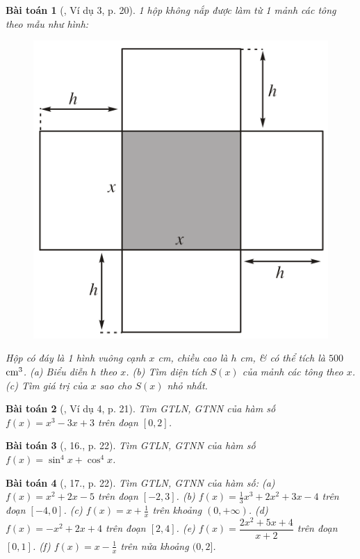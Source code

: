 \documentclass{article}
\newtheorem{baitoan}{Bài toán}
\begin{document}
\begin{baitoan}[\cite{SGK_Toan_12_giai_tich_nang_cao}, Ví dụ 3, p. 20]
	1 hộp không nắp được làm từ 1 mảnh các tông theo mẫu như hình:
	\begin{figure}[H]
		\centering
		\includegraphics[scale=.25]{hop_khong_nap}
	\end{figure}
	\noindent Hộp có đáy là 1 hình vuông cạnh $x$ {\rm cm}, chiều cao là $h$ {\rm cm}, \& có thể tích là $500$ $\rm cm^3$. (a) Biểu diễn $h$ theo $x$. (b) Tìm diện tích $S(x)$ của mảnh các tông theo $x$. (c) Tìm giá trị của $x$ sao cho $S(x)$ nhỏ nhất.
\end{baitoan}

\begin{baitoan}[\cite{SGK_Toan_12_giai_tich_nang_cao}, Ví dụ 4, p. 21]
	Tìm {\rm GTLN, GTNN} của hàm số $f(x) = x^3 - 3x + 3$ trên đoạn $[0,2]$.
\end{baitoan}

\begin{baitoan}[\cite{SGK_Toan_12_giai_tich_nang_cao}, 16., p. 22]
	Tìm {\rm GTLN, GTNN} của hàm số $f(x) = \sin^4x + \cos^4x$.
\end{baitoan}

\begin{baitoan}[\cite{SGK_Toan_12_giai_tich_nang_cao}, 17., p. 22]
	Tìm {\rm GTLN, GTNN} của hàm số: (a) $f(x) = x^2 + 2x - 5$ trên đoạn $[-2,3]$. (b) $f(x) = \frac{1}{3}x^3 + 2x^2 + 3x - 4$ trên đoạn $[-4,0]$. (c) $f(x) = x + \frac{1}{x}$ trên khoảng $(0,+\infty)$. (d) $f(x) = -x^2 + 2x + 4$ trên đoạn $[2,4]$. (e) $f(x) = \dfrac{2x^2 + 5x + 4}{x + 2}$ trên đoạn $[0,1]$. (f) $f(x) = x - \frac{1}{x}$ trên nửa khoảng $(0,2]$.
\end{baitoan}
\end{document}
